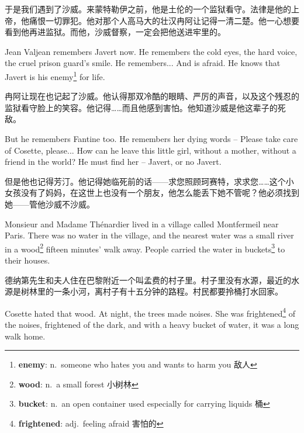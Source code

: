 \documentclass[fontset=ubuntu, zihao=5]{ctexart}
\begin{document}
\begin{paracol}{2}
  \switchcolumn

  于是我们遇到了沙威。来蒙特勒伊之前，他是土伦的一个监狱看守。法律是他的上帝，他痛恨一切罪犯。他对那个人高马大的壮汉冉阿让记得一清二楚。他一心想要看到他再进监狱。而他，沙威督察，一定会把他送进牢里的。

  \switchcolumn*

  Jean Valjean remembers Javert now. He remembers the cold eyes, the hard voice, the cruel prison guard's smile. He remembers... And is afraid. He knows that Javert is his enemy\footnote{\textbf{enemy}: n. someone who hates you and wants to harm you 敌人}
 for life.

  \switchcolumn

  冉阿让现在也记起了沙威。他认得那双冷酷的眼睛、严厉的声音，以及这个残忍的监狱看守脸上的笑容。他记得……而且他感到害怕。他知道沙威是他这辈子的死敌。

  \switchcolumn*

  But he remembers Fantine too. He remembers her dying words – Please take care of Cosette, please... How can he leave this little girl, without a mother, without a friend in the world? He must find her – Javert, or no Javert.

  \switchcolumn

  但是他也记得芳汀。他记得她临死前的话——求您照顾珂赛特，求求您……这个小女孩没有了妈妈，在这世上也没有一个朋友，他怎么能丢下她不管呢？他必须找到她——管他沙威不沙威。


  \switchcolumn*

  \sectionbreak

  Monsieur and Madame Thénardier lived in a village called Montfermeil near Paris. There was no water in the village, and the nearest water was a small river in a wood\footnote{\textbf{wood}: n. a small forest 小树林}
 fifteen minutes' walk away. People carried the water in buckets\footnote{\textbf{bucket}: n. an open container used especially for carrying liquids 桶}
 to their houses.

  \switchcolumn

  \sectionbreak

  德纳第先生和夫人住在巴黎附近一个叫孟费的村子里。村子里没有水源，最近的水源是树林里的一条小河，离村子有十五分钟的路程。村民都要拎桶打水回家。

  \switchcolumn*

  Cosette hated that wood. At night, the trees made noises. She was frightened\footnote{\textbf{frightened}: adj. feeling afraid 害怕的}
 of the noises, frightened of the dark, and with a heavy bucket of water, it was a long walk home.


\end{paracol}
\end{document}
